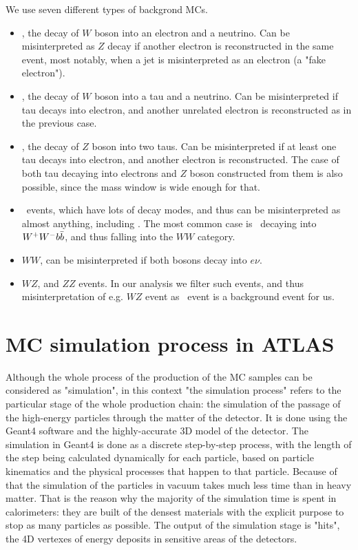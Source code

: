 We use seven different types of backgrond MCs.
\begin{itemize}
\item \Wenu, the decay of $W$ boson into an electron and a neutrino. Can be misinterpreted as $Z$ decay if another electron is reconstructed in the same event, most notably, when a jet is misinterpreted as an electron (a "fake electron").
\item \Wtau, the decay of $W$ boson into a tau and a neutrino. Can be misinterpreted if tau decays into electron, and another unrelated electron is reconstructed as in the previous case.
\item \Ztau, the decay of $Z$ boson into two taus. Can be misinterpreted if at least one tau decays into electron, and another electron is reconstructed. The case of both tau decaying into electrons and $Z$ boson constructed from them is also possible, since the mass window is wide enough for that.
\item \ttbar\ events, which have lots of decay modes, and thus can be misinterpreted as almost anything, including \Zee. The most common case is \ttbar\ decaying into $W^{+}W^{-}b\bar{b}$, and thus falling into the $WW$ category.
\item $WW$, can be misinterpreted if both bosons decay into $e\nu$.
\item $WZ$, and $ZZ$ events. In our analysis we filter such events, and thus misinterpretation of e.g. $WZ$ event as \Zee\ event is a background event for us.
\end{itemize}

\section{MC simulation process in ATLAS}
\label{sec:MC_sim}

Although the whole process of the production of the MC samples can be considered as "simulation", in this context "the simulation process" refers to the particular stage of the whole production chain: the simulation of the passage of the high-energy particles through the matter of the detector. It is done using the Geant4 software and the highly-accurate 3D model of the detector. The simulation in Geant4 is done as a discrete step-by-step process, with the length of the step being calculated dynamically for each particle, based on particle kinematics and the physical processes that happen to that particle. Because of that the simulation of the particles in vacuum takes much less time than in heavy matter. That is the reason why the majority of the simulation time is spent in calorimeters: they are built of the densest materials with the explicit purpose to stop as many particles as possible. The output of the simulation stage is "hits", the 4D vertexes of energy deposits in sensitive areas of the detectors.

